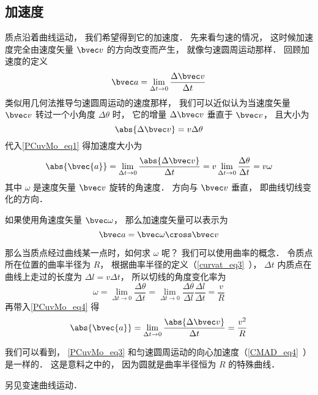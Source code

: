 


\subsection{加速度}
质点沿着曲线运动， 我们希望得到它的加速度． 先来看匀速的情况， 这时候加速度完全由速度矢量 $\bvec v$ 的方向改变而产生， 就像匀速圆周运动那样． 回顾加速度的定义
\begin{equation}\label{PCuvMo_eq2}
\bvec a = \lim_{\Delta t \to 0} \frac{\Delta \bvec v}{\Delta t}
\end{equation}
类似用几何法推导匀速圆周运动的速度那样， 我们可以近似认为当速度矢量 $\bvec v$ 转过一个小角度 $\Delta \theta$ 时， 它的增量 $\Delta \bvec v$ 垂直于 $\bvec v$， 且大小为
\begin{equation}\label{PCuvMo_eq1}
\abs{\Delta \bvec v} = v\Delta\theta
\end{equation}
代入\autoref{PCuvMo_eq1} 得加速度大小为
\begin{equation}\label{PCuvMo_eq4}
\abs{\bvec{a}} = \lim_{\Delta t \to 0} \frac{\abs{\Delta \bvec v}}{\Delta t}
= v\lim_{\Delta t \to 0}\frac{\Delta \theta}{\Delta t} = v\omega
\end{equation}
其中 $\omega$ 是速度矢量 $\bvec v$ 旋转的角速度． 方向与 $\bvec v$ 垂直， 即曲线切线变化的方向．

如果使用角速度矢量 $\bvec \omega$， 那么加速度矢量可以表示为
\begin{equation}
\bvec a = \bvec \omega \cross \bvec v
\end{equation}

那么当质点经过曲线某一点时，如何求 $\omega$ 呢？ 我们可以使用曲率的概念． 令质点所在位置的曲率半径为 $R$， 根据曲率半径的定义（\autoref{curvat_eq3}~）， $\Delta t$ 内质点在曲线上走过的长度为 $\Delta l = v \Delta t$， 所以切线的角度变化率为
\begin{equation}
\omega = \lim_{\Delta t\to 0}\frac{\Delta \theta}{\Delta t} = \lim_{\Delta t\to 0}\frac{\Delta \theta}{\Delta l} \frac{\Delta l}{\Delta t} = \frac{v}{R}
\end{equation}
再带入\autoref{PCuvMo_eq4} 得
\begin{equation}\label{PCuvMo_eq3}
\abs{\bvec{a}} = \lim_{\Delta t \to 0} \frac{\abs{\Delta \bvec v}}{\Delta t}
= \frac{v^2}{R}
\end{equation}


我们可以看到， \autoref{PCuvMo_eq3} 和匀速圆周运动的向心加速度（\autoref{CMAD_eq4}~）是一样的． 这是意料之中的， 因为圆就是曲率半径恒为 $R$ 的特殊曲线．

另见变速曲线运动．
